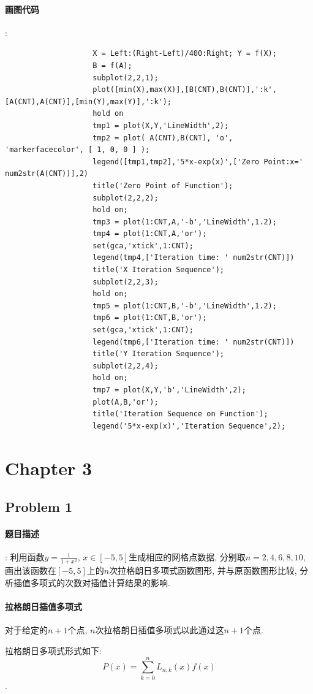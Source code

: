 \documentclass{article}
\begin{document}
\begin{CJK*}{UTF8}{song}
			\paragraph{画图代码}:\newline
				\begin{lstlisting}
					X = Left:(Right-Left)/400:Right; Y = f(X);
					B = f(A);
					subplot(2,2,1);
					plot([min(X),max(X)],[B(CNT),B(CNT)],':k',[A(CNT),A(CNT)],[min(Y),max(Y)],':k');
					hold on
					tmp1 = plot(X,Y,'LineWidth',2);
					tmp2 = plot( A(CNT),B(CNT), 'o', 'markerfacecolor', [ 1, 0, 0 ] );
					legend([tmp1,tmp2],'5*x-exp(x)',['Zero Point:x=' num2str(A(CNT))],2)                       
					title('Zero Point of Function');
					subplot(2,2,2);
					hold on;
					tmp3 = plot(1:CNT,A,'-b','LineWidth',1.2);
					tmp4 = plot(1:CNT,A,'or');
					set(gca,'xtick',1:CNT);
					legend(tmp4,['Iteration time: ' num2str(CNT)])
					title('X Iteration Sequence');
					subplot(2,2,3);
					hold on;
					tmp5 = plot(1:CNT,B,'-b','LineWidth',1.2);
					tmp6 = plot(1:CNT,B,'or');
					set(gca,'xtick',1:CNT);
					legend(tmp6,['Iteration time: ' num2str(CNT)])
					title('Y Iteration Sequence');
					subplot(2,2,4);
					hold on;
					tmp7 = plot(X,Y,'b','LineWidth',2);
					plot(A,B,'or');
					title('Iteration Sequence on Function');
					legend('5*x-exp(x)','Iteration Sequence',2);
				\end{lstlisting}
	\section{Chapter 3}
		\subsection{Problem 1}
		 	\paragraph{题目描述}
		 		:\newline 
		 		利用函数$y=\frac{1}{1+x^2}$, $x \in \left[-5,5\right]$生成相应的网格点数据, 分别取$n=2,4,6,8,10$, 画出该函数在$\left[-5,5\right]$上的$n$次拉格朗日多项式函数图形, 并与原函数图形比较, 分析插值多项式的次数对插值计算结果的影响.
		 	\paragraph{拉格朗日插值多项式}
		 		对于给定的$n+1$个点, $n$次拉格朗日插值多项式以此通过这$n+1$个点.
		 		
		 		拉格朗日多项式形式如下:
		 		$$P\left(x\right) = \sum_{k=0}^{n}L_{n,k}\left(x\right) f\left(x\right)$$.
		 		

\end{CJK*}
\end{document}
